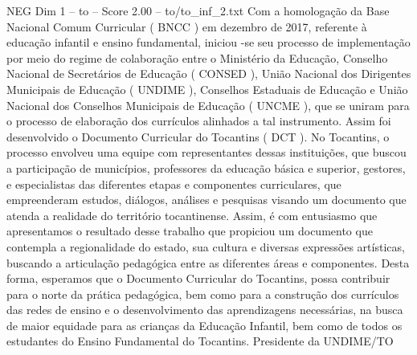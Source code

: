 \begin{textsample}{NEG Dim 1 – to – Score 2.00 – to/to\_inf\_2.txt}  \label{ex:f1_neg_036}
Com a homologação da Base Nacional Comum Curricular ( BNCC ) em dezembro de 2017, referente à educação infantil e ensino fundamental, iniciou -se seu processo de implementação por meio do regime de colaboração entre o Ministério da Educação, Conselho Nacional de Secretários de Educação ( CONSED ), União Nacional dos Dirigentes Municipais de Educação ( UNDIME ), Conselhos Estaduais de Educação e União Nacional dos Conselhos Municipais de Educação ( UNCME ), que se uniram para o processo de elaboração dos currículos alinhados a tal instrumento.
Assim foi desenvolvido o Documento Curricular do Tocantins ( DCT ).
No Tocantins, o processo envolveu uma equipe com representantes dessas instituições, que buscou a participação de municípios, professores da educação básica e superior, gestores, e especialistas das diferentes etapas e componentes curriculares, que empreenderam estudos, diálogos, análises e pesquisas visando um documento que atenda a realidade do território tocantinense.
Assim, é com entusiasmo que apresentamos o resultado desse trabalho que propiciou um documento que contempla a regionalidade do estado, sua cultura e diversas expressões artísticas, buscando a articulação pedagógica entre as diferentes áreas e componentes.
Desta forma, esperamos que o Documento Curricular do Tocantins, possa contribuir para o norte da prática pedagógica, bem como para a construção dos currículos das redes de ensino e o desenvolvimento das aprendizagens necessárias, na busca de maior equidade para as crianças da Educação Infantil, bem como de todos os estudantes do Ensino Fundamental do Tocantins.
Presidente da UNDIME/TO

\end{textsample}
